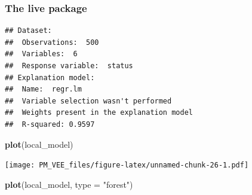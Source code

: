 \documentclass[]{krantz}
\newenvironment{Shaded}{\begin{snugshade}}{\end{snugshade}}
\newcommand{\ControlFlowTok}[1]{\textcolor[rgb]{0.13,0.29,0.53}{\textbf{#1}}}
\newcommand{\DataTypeTok}[1]{\textcolor[rgb]{0.13,0.29,0.53}{#1}}
\newcommand{\DecValTok}[1]{\textcolor[rgb]{0.00,0.00,0.81}{#1}}
\newcommand{\KeywordTok}[1]{\textcolor[rgb]{0.13,0.29,0.53}{\textbf{#1}}}
\newcommand{\NormalTok}[1]{#1}
\newcommand{\OperatorTok}[1]{\textcolor[rgb]{0.81,0.36,0.00}{\textbf{#1}}}
\newcommand{\StringTok}[1]{\textcolor[rgb]{0.31,0.60,0.02}{#1}}
\theoremstyle{definition}
\theoremstyle{definition}
\theoremstyle{definition}
\theoremstyle{remark}
\begin{document}
\hypertarget{the-live-package}{%
\subsubsection{\texorpdfstring{\textbf{The live
package}}{The live package}}\label{the-live-package}}

\begin{Shaded}
\end{Shaded}

\begin{verbatim}
## Dataset: 
##  Observations:  500 
##  Variables:  6 
##  Response variable:  status 
## Explanation model: 
##  Name:  regr.lm 
##  Variable selection wasn't performed 
##  Weights present in the explanation model 
##  R-squared: 0.9597
\end{verbatim}

\begin{Shaded}
\begin{Highlighting}[]
\KeywordTok{plot}\NormalTok{(local_model)}
\end{Highlighting}
\end{Shaded}

\texttt{[image: PM\_VEE\_files/figure-latex/unnamed-chunk-26-1.pdf]}

\begin{Shaded}
\begin{Highlighting}[]
\KeywordTok{plot}\NormalTok{(local_model, }\DataTypeTok{type =} \StringTok{"forest"}\NormalTok{)}
\end{Highlighting}
\end{Shaded}
\end{document}
